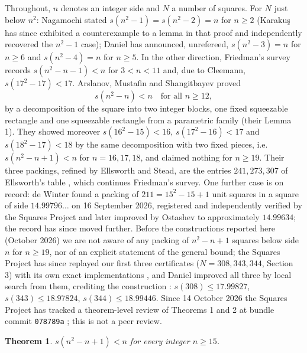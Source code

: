 \documentclass[11pt,letterpaper]{amsart}
\theoremstyle{plain}
\newtheorem{theorem}{Theorem}
\begin{document}
Throughout, $n$ denotes an integer side and $N$ a number of squares. For $N$ just below $n^2$: Nagamochi \cite{Nag05} stated $s(n^2 - 1) = s(n^2 - 2) = n$ for $n \ge 2$ (Karaku\c{s} \cite{Kar26} has since exhibited a counterexample to a lemma in that proof and independently recovered the $n^2 - 1$ case); Daniel \cite{Dan26} has announced, unrefereed, $s(n^2 - 3) = n$ for $n \ge 6$ and $s(n^2 - 4) = n$ for $n \ge 5$. In the other direction, Friedman's survey \cite{Fri09} records $s(n^2 - n - 1) < n$ for $3 < n < 11$ and, due to Cleemann, $s(17^2 - 17) < 17$. Arslanov, Mustafin and Shangitbayev \cite{AMS21} proved
\begin{equation}\label{eq:ams}
s(n^2 - n) < n \quad \text{for all } n \ge 12,
\end{equation}
by a decomposition of the square into two integer blocks, one fixed squeezable rectangle and one squeezable rectangle from a parametric family (their Lemma 1). They showed moreover $s(16^2 - 15) < 16$, $s(17^2 - 16) < 17$ and $s(18^2 - 17) < 18$ by the same decomposition with two fixed pieces, i.e. $s(n^2 - n + 1) < n$ for $n = 16, 17, 18$, and claimed nothing for $n \ge 19$. Their three packings, refined by Ellsworth and Stead, are the entries $241, 273, 307$ of Ellsworth's table \cite{Ell26}, which continues Friedman's survey. One further case is on record: de Winter \cite{dW26} found a packing of $211 = 15^2 - 15 + 1$ unit squares in a square of side $14.99796\ldots$ on 16 September 2026, registered and independently verified by the Squares Project \cite{Lev26} and later improved by Ostashev to approximately $14.99634$; the record has since moved further. Before the constructions reported here (October 2026) we are not aware of any packing of $n^2 - n + 1$ squares below side $n$ for $n \ge 19$, nor of an explicit statement of the general bound; the Squares Project has since replayed our first three certificates ($N = 308, 343, 344$, Section 3) with its own exact implementations \cite[issue 484]{Lev26}, and Daniel improved all three by local search from them, crediting the construction \cite[issue 489]{Dan26}: $s(308) \le 17.99827$, $s(343) \le 18.97824$, $s(344) \le 18.99446$. Since 14 October 2026 the Squares Project has tracked a theorem-level review of Theorems 1 and 2 at bundle commit \texttt{078789a} \cite[issue 603]{Lev26}; this is not a peer review.

\begin{theorem}
$s(n^2 - n + 1) < n$ for every integer $n \ge 15$.
\end{theorem}
\end{document}
